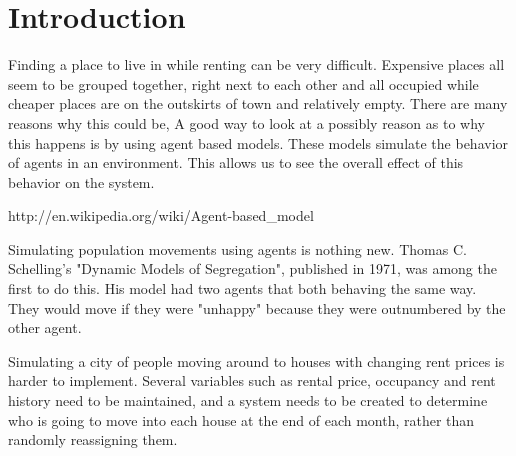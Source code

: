 \section{Introduction}

\par
Finding a place to live in while renting can be very difficult. Expensive places all seem to be grouped together, right next to each other and all occupied while cheaper places are on the outskirts of town and relatively empty. There are many reasons why this could be, A good way to look at a possibly reason as to why this happens is by using agent based models. These models simulate the behavior of agents in an environment. This allows us to see the overall effect of this behavior on the system.

\par
http://en.wikipedia.org/wiki/Agent-based\_model

\par
Simulating population movements using agents is nothing new. Thomas C. Schelling's "Dynamic Models of Segregation", published in 1971, was among the first to do this. His model had two agents that both behaving the same way. They would move if they were "unhappy" because they were outnumbered by the other agent.

\par
Simulating a city of people moving around to houses with changing rent prices is harder to implement. Several variables such as rental price, occupancy and rent history need to be maintained, and a system needs to be created to determine who is going to move into each house at the end of each month, rather than randomly reassigning them.

